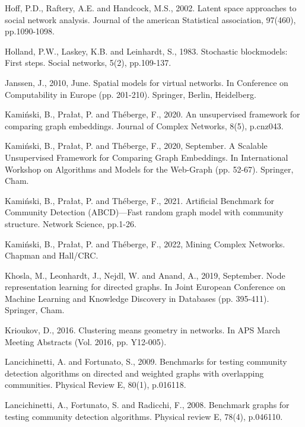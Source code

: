 \documentclass[11pt]{article}
\begin{document}
\begin{thebibliography}{10}
 Hoff, P.D., Raftery, A.E. and Handcock, M.S., 2002. Latent space approaches to social network analysis. Journal of the american Statistical association, 97(460), pp.1090-1098.

 Holland, P.W., Laskey, K.B. and Leinhardt, S., 1983. Stochastic blockmodels: First steps. Social networks, 5(2), pp.109-137.

 Janssen, J., 2010, June. Spatial models for virtual networks. In Conference on Computability in Europe (pp. 201-210). Springer, Berlin, Heidelberg.

 Kamiński, B., Prałat, P. and Théberge, F., 2020. An unsupervised framework for comparing graph embeddings. Journal of Complex Networks, 8(5), p.cnz043.

 Kamiński, B., Prałat, P. and Théberge, F., 2020, September. A Scalable Unsupervised Framework for Comparing Graph Embeddings. In International Workshop on Algorithms and Models for the Web-Graph (pp. 52-67). Springer, Cham.

 Kamiński, B., Prałat, P. and Théberge, F., 2021. Artificial Benchmark for Community Detection (ABCD)—Fast random graph model with community structure. Network Science, pp.1-26.

 Kamiński, B., Prałat, P. and Théberge, F., 2022, Mining Complex Networks. Chapman and Hall/CRC.

 Khosla, M., Leonhardt, J., Nejdl, W. and Anand, A., 2019, September. Node representation learning for directed graphs. In Joint European Conference on Machine Learning and Knowledge Discovery in Databases (pp. 395-411). Springer, Cham.

 Krioukov, D., 2016. Clustering means geometry in networks. In APS March Meeting Abstracts (Vol. 2016, pp. Y12-005).

 Lancichinetti, A. and Fortunato, S., 2009. Benchmarks for testing community detection algorithms on directed and weighted graphs with overlapping communities. Physical Review E, 80(1), p.016118.

 Lancichinetti, A., Fortunato, S. and Radicchi, F., 2008. Benchmark graphs for testing community detection algorithms. Physical review E, 78(4), p.046110.



\end{thebibliography}
\end{document}
